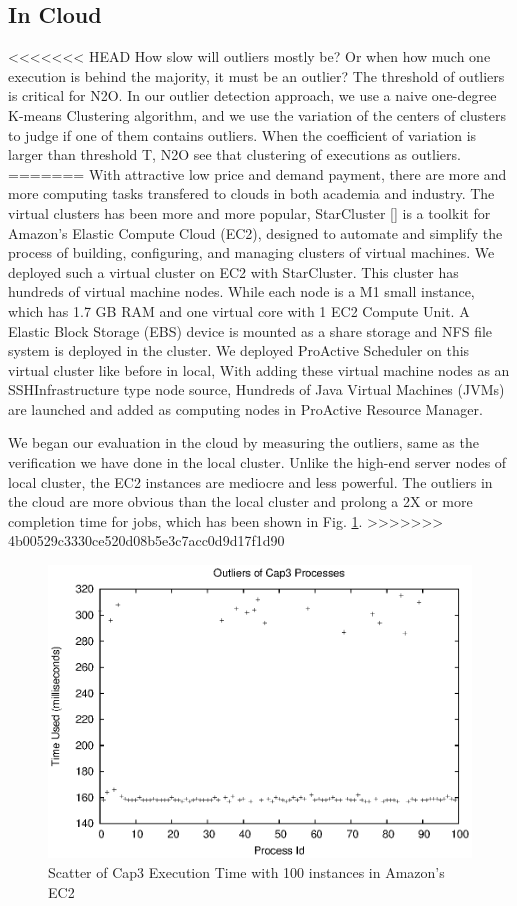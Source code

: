 \subsection{In Cloud}

<<<<<<< HEAD
How slow will outliers mostly be? Or when how much one execution is behind the majority, it must be an outlier? The threshold of outliers is critical for N2O. In our outlier detection approach, we use a naive one-degree K-means Clustering algorithm, and we use the variation of the centers of clusters to judge if one of them contains outliers. When the coefficient of variation is larger than threshold T, N2O see that clustering of executions as outliers.
=======
With attractive low price and demand payment, there are more and more computing tasks transfered to clouds in both academia and industry. The virtual clusters has been more and more popular, StarCluster [] is a toolkit for Amazon’s Elastic Compute Cloud (EC2), designed to automate and simplify the process of building, configuring, and managing clusters of virtual machines. We deployed such a virtual cluster on EC2 with StarCluster. This cluster has hundreds of virtual machine nodes. While each node is a M1 small instance, which has 1.7 GB RAM and one virtual core with 1 EC2 Compute Unit. A Elastic Block Storage (EBS) device is mounted as a share storage and  NFS file system is deployed in the cluster. We deployed ProActive Scheduler on this virtual cluster like before in local, With adding these virtual machine nodes as an SSHInfrastructure type node source, Hundreds of Java Virtual Machines (JVMs) are launched and added as computing nodes in ProActive Resource Manager.

We began our evaluation in the cloud by measuring the outliers, same as the verification we have done in the local cluster. Unlike the high-end server nodes of local cluster, the EC2 instances are mediocre and less powerful. The outliers in the cloud are more obvious than the local cluster and prolong a 2X or more completion time for jobs, which has been shown in Fig. \ref{figure:outlier_cloud}.
>>>>>>> 4b00529c3330ce520d08b5e3c7acc0d9d17f1d90

\begin{figure}
\centering
\includegraphics[width=0.9\columnwidth]{figures/cloud_outliers.eps}
\caption{Scatter of Cap3 Execution Time with 100 instances in Amazon's EC2}
\label{figure:outlier_cloud}
\end{figure}

